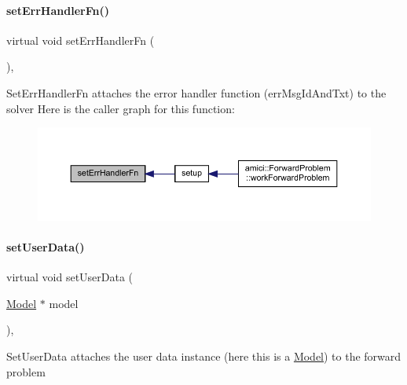 \paragraph{\texorpdfstring{set\+Err\+Handler\+Fn()}{setErrHandlerFn()}}
{\footnotesize\ttfamily virtual void set\+Err\+Handler\+Fn (\begin{DoxyParamCaption}{ }\end{DoxyParamCaption})\hspace{0.3cm}{\ttfamily [protected]}, {}}

Set\+Err\+Handler\+Fn attaches the error handler function (err\+Msg\+Id\+And\+Txt) to the solver Here is the caller graph for this function\+:
\nopagebreak
\begin{figure}[H]
\begin{center}
\leavevmode
\includegraphics[width=350pt]{classamici_1_1_solver_ab5e90e0ad8f195cd6ca2ce477cc734b7_icgraph}
\end{center}
\end{figure}
\mbox{\label{classamici_1_1_solver_ac1ca4675503688acf946f6530fb12c10}} 
\paragraph{\texorpdfstring{set\+User\+Data()}{setUserData()}}
{\footnotesize\ttfamily virtual void set\+User\+Data (\begin{DoxyParamCaption}\item[{\mbox{\hyperlink{classamici_1_1_model}{Model}} $\ast$}]{model }\end{DoxyParamCaption})\hspace{0.3cm}{\ttfamily [protected]}, {}}

Set\+User\+Data attaches the user data instance (here this is a \mbox{\hyperlink{classamici_1_1_model}{Model}}) to the forward problem


